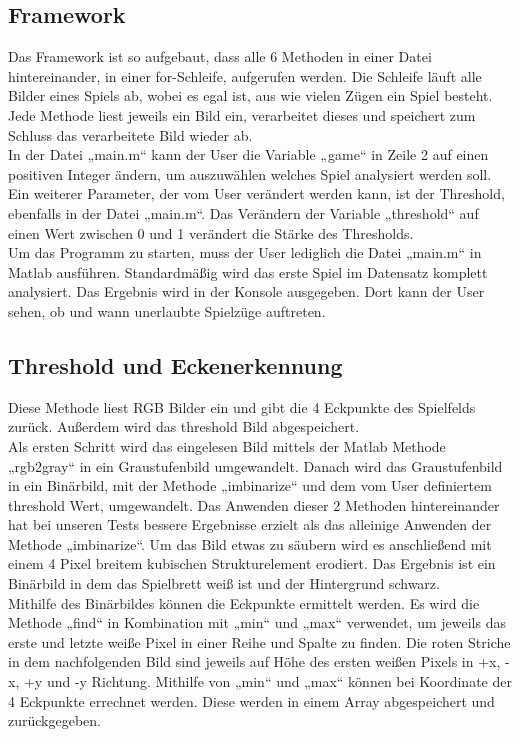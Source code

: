 \documentclass[paper=A4, deutsch]{scrartcl}
\begin{document}
\subsection{Framework}
Das Framework ist so aufgebaut, dass alle 6 Methoden in einer Datei hintereinander, in einer for-Schleife, aufgerufen werden. Die Schleife läuft alle Bilder eines Spiels ab, wobei es egal ist, aus wie vielen Zügen ein Spiel besteht. Jede Methode liest jeweils ein Bild ein, verarbeitet dieses und speichert zum Schluss das verarbeitete Bild wieder ab.\\
In der Datei „main.m“ kann der User die Variable „game“ in Zeile 2 auf einen positiven Integer ändern, um auszuwählen welches Spiel analysiert werden soll. Ein weiterer Parameter, der vom User verändert werden kann, ist der Threshold, ebenfalls in der Datei „main.m“. Das Verändern der Variable „threshold“ auf einen Wert zwischen 0 und 1 verändert die Stärke des Thresholds.\\
Um das Programm zu starten, muss der User lediglich die Datei „main.m“ in Matlab ausführen. Standardmäßig wird das erste Spiel im Datensatz komplett analysiert. Das Ergebnis wird in der Konsole ausgegeben. Dort kann der User sehen, ob und wann unerlaubte Spielzüge auftreten.\\

\subsection{Threshold und Eckenerkennung}
Diese Methode liest RGB Bilder ein und gibt die 4 Eckpunkte des Spielfelds zurück. Außerdem wird das threshold Bild abgespeichert.\\
Als ersten Schritt wird das eingelesen Bild mittels der Matlab Methode „rgb2gray“ in ein Graustufenbild umgewandelt. Danach wird das Graustufenbild in ein Binärbild, mit der Methode „imbinarize“ und dem vom User definiertem threshold Wert, umgewandelt. Das Anwenden dieser 2 Methoden hintereinander hat bei unseren Tests bessere Ergebnisse erzielt als das alleinige Anwenden der Methode „imbinarize“. Um das Bild etwas zu säubern wird es anschließend mit einem  4 Pixel breitem kubischen Strukturelement erodiert. Das Ergebnis ist ein Binärbild in dem das Spielbrett weiß ist und der Hintergrund schwarz.\\
Mithilfe des Binärbildes können die Eckpunkte ermittelt werden. Es wird die Methode „find“ in Kombination mit „min“ und „max“ verwendet, um jeweils das erste und letzte weiße Pixel in einer Reihe und Spalte zu finden. Die roten Striche in dem nachfolgenden Bild sind jeweils auf Höhe des ersten weißen Pixels in +x, -x, +y und -y Richtung. Mithilfe von „min“ und „max“ können bei Koordinate der 4 Eckpunkte errechnet werden. Diese werden in einem Array abgespeichert und zurückgegeben.\\
\end{document}
